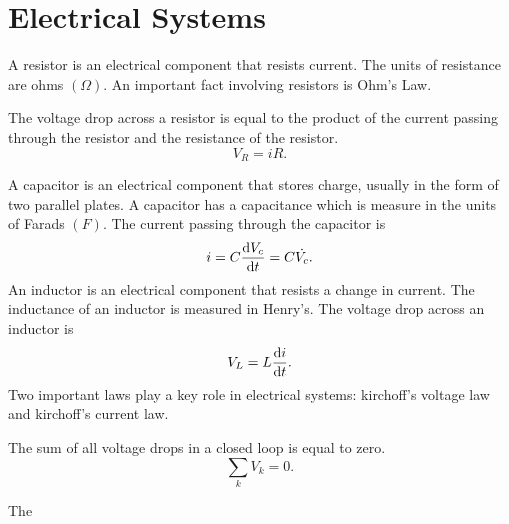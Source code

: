 \chapter{Electrical Systems}

A \alert{resistor} is an electrical component that resists current. The units of
resistance are ohms $(\Omega)$. An important fact involving resistors is
\alert{Ohm's Law}.

\begin{theorem}
    The voltage drop across a resistor is equal to the product of the current passing
    through the resistor and the resistance of the resistor.
    $$V_R = iR.$$
\end{theorem}

A \alert{capacitor} is an electrical component that stores charge, usually in the form
of two parallel plates. A capacitor has a capacitance which is measure in the units of
Farads $(F)$. The current passing through the capacitor is
$$i = C \frac{\dif V_c}{\dif t} = C\dot{V_c}.$$
An \alert{inductor} is an electrical component that resists a change in current.
The inductance of an inductor is measured in Henry's. The voltage drop
across an inductor is
$$V_L = L \frac{\dif i}{\dif t}.$$
Two important laws play a key role in electrical systems: \alert{kirchoff's voltage
law} and \alert{kirchoff's current law}.
\begin{theorem}
    The sum of all voltage drops in a closed loop is equal to zero.
    $$\sum_k V_k = 0.$$
\end{theorem}

\begin{theorem}
    The 
\end{theorem}

